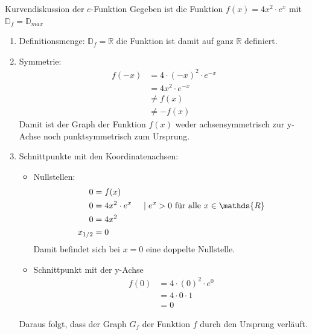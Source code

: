  \begin{bsp}{Kurvendiskussion der $e$-Funktion}{}
Gegeben ist die Funktion $f(x) = 4x^2\cdot e^x$ mit $\mathds{D}_f = \mathds{D}_{max}$
\begin{enumerate}
    \item Definitionsmenge: $\mathds{D}_f = \mathds{R}$ die Funktion ist damit auf ganz $\mathds{R}$ definiert.
    \item Symmetrie:
    \begin{equation*}
        \begin{split}
            f(-x) &= 4\cdot(-x)^2 \cdot e^{-x}\\
            &= 4x^2\cdot e^{-x}\\
            &\neq f(x)\\
            &\neq -f(x)
        \end{split}
    \end{equation*}
    Damit ist der Graph der Funktion $f(x)$ weder achsensymmetrisch zur y-Achse noch punktsymmetrisch zum Ursprung.
    \item Schnittpunkte mit den Koordinatenachsen:
    \begin{itemize}
        \item Nullstellen:
        \begin{equation*}
            \begin{split}
                0 &=f(x)\\
               0 &= 4x^2\cdot e^x\hspace{0.5cm}|\hspace{0.1cm} e^x >0 \text{ für alle } x \in \mathds{R}\\
               0 &=4x^2\\
               x_{1/2} &= 0
            \end{split}
        \end{equation*}
        Damit befindet sich bei $x=0$ eine doppelte Nullstelle.
        \item Schnittpunkt mit der y-Achse
        \begin{equation*}
            \begin{split}
                f(0)&= 4\cdot (0)^2 \cdot e^{0}\\
                &= 4\cdot 0 \cdot 1\\
                &= 0
            \end{split}
        \end{equation*}
    \end{itemize}
    Daraus folgt, dass der Graph $G_f$ der Funktion $f$ durch den Ursprung verläuft.

\end{enumerate}
\end{bsp}
